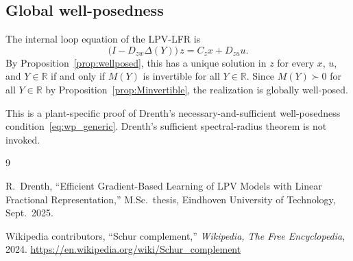 \documentclass[11pt]{article}
\begin{document}
\subsection{Global well-posedness}

The internal loop equation of the LPV-LFR is
\begin{equation}
    \bigl(I - D_{zw}\Delta(Y)\bigr)\,z = C_z x + D_{zu} u.
    \label{eq:loopequation}
\end{equation}
By Proposition~\ref{prop:wellposed}, this has a unique solution in $z$ for every
$x$, $u$, and $Y\in\mathbb{R}$ if and only if $M(Y)$ is invertible for all
$Y\in\mathbb{R}$.  Since $M(Y)\succ 0$ for all $Y\in\mathbb{R}$ by
Proposition~\ref{prop:Minvertible}, the realization is globally well-posed.

This is a plant-specific proof of Drenth's necessary-and-sufficient
well-posedness condition~\eqref{eq:wp_generic}.  Drenth's sufficient
spectral-radius theorem is not invoked.

\newpage

\begin{thebibliography}{9}

R.~Drenth,
``Efficient Gradient-Based Learning of {LPV} Models with Linear Fractional Representation,''
M.Sc.\ thesis, Eindhoven University of Technology, Sept.\ 2025.

Wikipedia contributors,
``Schur complement,''
\textit{Wikipedia, The Free Encyclopedia},
2024.
\url{https://en.wikipedia.org/wiki/Schur_complement}

\end{thebibliography}
\end{document}
